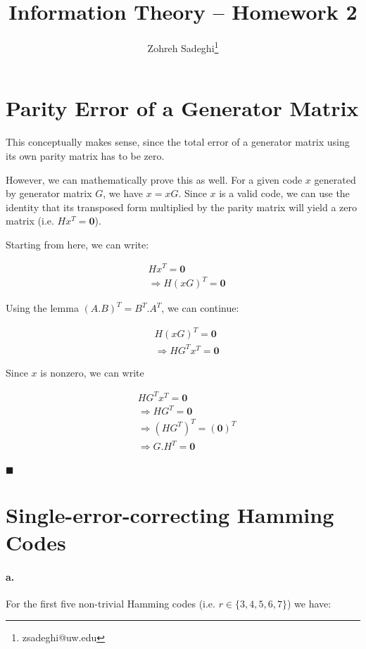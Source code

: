 \documentclass{article}
\title{Information Theory -- Homework 2}
\author{Zohreh Sadeghi\thanks{zsadeghi@uw.edu}}
\begin{document}
\maketitle
\tableofcontents
\clearpage

\section{Parity Error of a Generator Matrix}

This conceptually makes sense, since the total error of a generator matrix using
its own parity matrix has to be zero.

However, we can mathematically prove this as well. For a given code $x$ generated
by generator matrix $G$, we have $x=xG$. Since $x$ is a valid code, we can use the
identity that its transposed form multiplied by the parity matrix will yield a zero
matrix (i.e. $Hx^T=\textbf{0}$).

Starting from here, we can write:

\begin{align*}
  &Hx^T=\textbf{0}\\
  &\Rightarrow H(xG)^T=\textbf{0}
\end{align*}

Using the lemma $(A.B)^T=B^T.A^T$, we can continue:

\begin{align*}
  &H(xG)^T=\textbf{0} \\
  &\Rightarrow HG^Tx^T=\textbf{0}
\end{align*}

Since $x$ is nonzero, we can write

\begin{align*}
  &HG^Tx^T=\textbf{0} \\
  &\Rightarrow HG^T=\textbf{0} \\
  &\Rightarrow (HG^T)^T=(\textbf{0})^T \\
  &\Rightarrow G.H^T=\textbf{0} \\
\end{align*}

\begin{flushright}
  $\blacksquare$
\end{flushright}

\section{Single-error-correcting Hamming Codes}

\paragraph{a.} For the first five non-trivial Hamming codes
(i.e. $r \in \{3, 4, 5, 6, 7\}$) we have:
\end{document}

